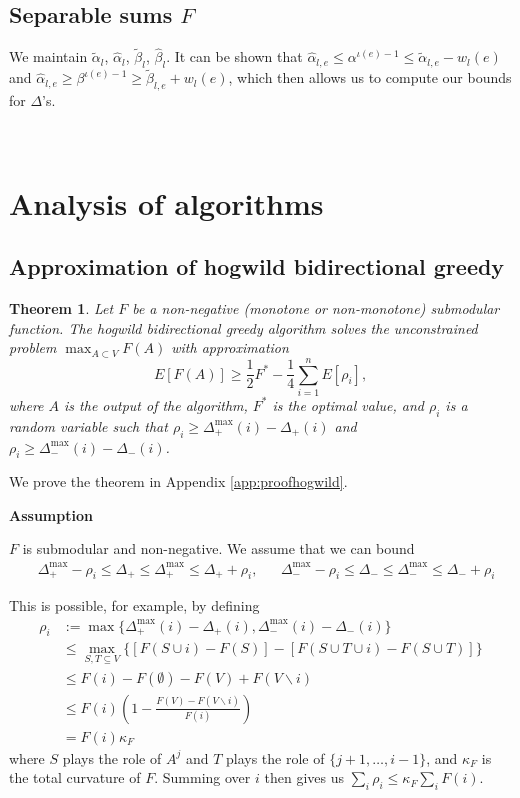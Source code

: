 \documentclass{article} %
\newtheorem{thm}{Theorem}[section]
\begin{document}
\subsection{Separable sums $F$}
We maintain $\tilde\alpha_l$, $\hat\alpha_l$, $\tilde\beta_l$, $\hat\beta_l$.
It can be shown that $\hat\alpha_{l,e} \leq \alpha^{\iota(e)-1} \leq \tilde\alpha_{l,e} - w_l(e)$ and $\hat\alpha_{l,e} \geq \beta^{\iota(e)-1} \geq \tilde\beta_{l,e} + w_l(e)$, which then allows us to compute our bounds for $\Delta$'s.

~











\section{Analysis of algorithms}

\subsection{Approximation of hogwild bidirectional greedy}
\begin{thm}\label{thm:randomapprox} Let $F$ be a non-negative (monotone or non-monotone) submodular function.
The hogwild bidirectional greedy algorithm solves the unconstrained problem $\max_{A\subset V} F(A)$ with approximation
\[
E[F(A)] \geq \frac{1}{2}F^* - \frac{1}{4}\sum_{i=1}^n E[\rho_i],
\]
where $A$ is the output of the algorithm, $F^*$ is the optimal value, and $\rho_i$ is a random variable such that $\rho_i \geq \Delta_+^{\max}(i) - \Delta_+(i)$ and $\rho_i \geq \Delta_-^{\max}(i) - \Delta_-(i)$.
\end{thm}

We prove the theorem in Appendix \ref{app:proofhogwild}.

\textbf{Assumption}

$F$ is submodular and non-negative.
We assume that we can bound
\begin{align*}
&\Delta_+^{\max} - \rho_i \leq \Delta_+ \leq \Delta_+^{\max} \leq \Delta_+ + \rho_i,&
&\Delta_-^{\max} - \rho_i \leq \Delta_- \leq \Delta_-^{\max} \leq \Delta_- + \rho_i
\end{align*}

This is possible, for example, by defining
\begin{align*}
\rho_i
&:= \max\{\Delta_+^{\max}(i) - \Delta_+(i), \Delta_-^{\max}(i) - \Delta_-(i)\}\\
&\leq \max_{S,T\subseteq V} \{[F(S\cup i) - F(S)] - [F(S \cup T \cup i) - F(S \cup T)]\}\\
&\leq F(i) - F(\emptyset) - F(V) + F(V\backslash i)\\
&\leq F(i)\left(1 - \frac{F(V) - F(V\backslash i)}{F(i)}\right)\\
&= F(i)\kappa_F
\end{align*}
where $S$ plays the role of $A^j$ and $T$ plays the role of $\{j+1,\dots, i-1\}$, and $\kappa_F$ is the total curvature of $F$.
Summing over $i$ then gives us $\sum_i \rho_i \leq \kappa_F\sum_i F(i)$.
\end{document}
